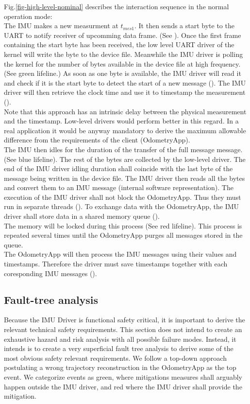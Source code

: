 Fig.\ref{fig-high-level-nominal} describes the interaction sequence in the normal operation mode:\\
The IMU makes a new measurment at $t_{mes1}$.
It then sends a start byte to the UART to notify receiver of upcomming data frame. (See ).
Once the first frame containing the start byte has been received, the low level UART driver of the kernel will write the byte to the device file.
Meanwhile the IMU driver is polling the kernel for the number of bytes available in the device file at high frequency. (See green lifeline.)
As soon as one byte is available, the IMU driver will read it and check if it is the start byte to detect the start of a new message ().
The IMU driver will then retrieve the clock time and use it to timestamp the measurement ().\\
Note that this approach has an intrinsic delay between the physical measurement and the timestamp.
Low-level drivers would perform better in this regard. In a real application it would be anyway mandatory to derive the maximum allowable difference from the requirements of the client (OdometryApp).\\
The IMU then idles for the duration of the transfer of the full message message. (See blue lifeline).
The rest of the bytes are collected by the low-level driver.
The end of the IMU driver idling duration shall coincide with the last byte of the message being written in the device file.
The IMU driver then reads all the bytes and convert them to an IMU message (internal software representation).
The execution of the IMU driver shall not block the OdometryApp. Thus they must run in separate threads ().
To exchange data with the OdometryApp, the IMU driver shall store data in a shared memory queue ().\\
The memory will be locked during this process (See red lifeline).
This process is repeated several times until the OdometryApp purges all messages stored in the queue.\\
The OdometryApp will then process the IMU messages using their values and timestamps.
Therefore the driver must save timestamps together with each coresponding IMU messages ().

\subsection{Fault-tree analysis}
Because the IMU Driver is functional safety critical, it is important to derive the relevant technical safety requirements.
This section does not intend to create an exhaustive hazard and risk analysis with all possible failure modes.
Instead, it intends is to create a very superficial fault tree analysis to derive some of the most obvious safety relevant requirements.
We follow a top-down approach postulating a wrong trajectory reconstruction in the OdometryApp as the top event.
We categorize events as green, where mitigations measures shall arguably happen outside the IMU driver, and red where the IMU driver shall provide the mitigation.

